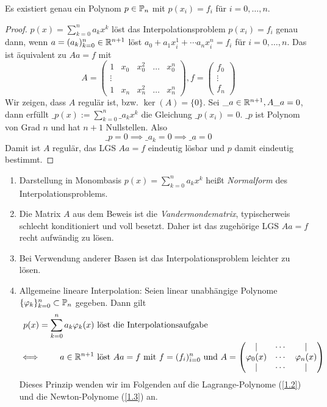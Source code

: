 \documentclass[
]{mycourse}
\begin{document}
\begin{st}
	\label{1.1}
	Es existiert genau ein Polynom $p\in \P_n$ mit $p(x_i)=f_i$ für $i=0,\dotsc,n$.
	\begin{proof}
		$p(x) = \sum_{k=0}^n a_k x^k$ löst das Interpolationsproblem $p(x_i)=f_i$ genau dann, wenn $a=(a_k)_{k=0}^n \in \R^{n+1}$ löst $a_0 +a_1x_i^1 + \dotsb a_nx_i^n = f_i$ für $i=0,\dotsc,n$.
		Das ist äquivalent zu $Aa=f$ mit
		\[
		A= \begin{pmatrix} 1 & x_0 & x_0^2 & \hdots & x_0^n \\
		\vdots  \\
		1 & x_n & x_n^2 & \hdots & x_n^n\end{pmatrix}, f= \begin{pmatrix}f_0 \\ \vdots \\ f_n\end{pmatrix}
		\]
		Wir zeigen, dass $A$ regulär ist, bzw. $\ker(A) = \{0\}$.
		Sei $\_a \in \R^{n+1}, A\_a=0$, dann erfüllt
		$\_p(x) := \sum_{k=0}^n\_a_k x^k$ die Gleichung $\_p(x_i)=0$.
		$\_p$ ist Polynom von Grad $n$ und hat $n+1$ Nullstellen. 
		Also 
		\[
			\_p=0 \implies \_a_k=0 \implies \_a=0
		\]
		Damit ist $A$ regulär, das LGS $Aa=f$ eindeutig lösbar und $p$ damit eindeutig bestimmt.
	\end{proof}
	\begin{note}
		\begin{enumerate}
			\item 
				Darstellung in Monombasis $p(x)= \sum_{k=0}^n a_kx^k$ heißt \emph{Normalform} des Interpolationsproblems.
			\item
				Die Matrix $A$ aus dem Beweis ist die \emph{Vandermondematrix}, typischerweis schlecht konditioniert und voll besetzt.
				Daher ist das zugehörige LGS $Aa=f$ recht aufwändig zu lösen.
			\item
				Bei Verwendung anderer Basen ist das Interpolationsproblem leichter zu lösen.
			\item
				Allgemeine lineare Interpolation:
				Seien linear unabhängige Polynome $\{\phi_k\}_{k=0}^n \subset \P_n$ gegeben.
				Dann gilt
				\begin{align*}
					p(x) = \sum_{k=0}^n a_k \phi_k(x) &\text{ löst die Interpolationsaufgabe}\\
					\iff \qquad a\in \R^{n+1} &\text{ löst } Aa=f \text{ mit } f=(f_i)_{i=0}^n \text{ und } A= \begin{pmatrix}\mid & \cdots & \mid \\
						\phi_0(x) & \cdots & \phi_n(x)\\
						\mid & \cdots & \mid
					\end{pmatrix}
				\end{align*}
				Dieses Prinzip wenden wir im Folgenden auf die Lagrange-Polynome (\ref{1.2}) und die Newton-Polynome (\ref{1.3}) an.
		\end{enumerate}
		
	\end{note}
\end{st}
\end{document}
